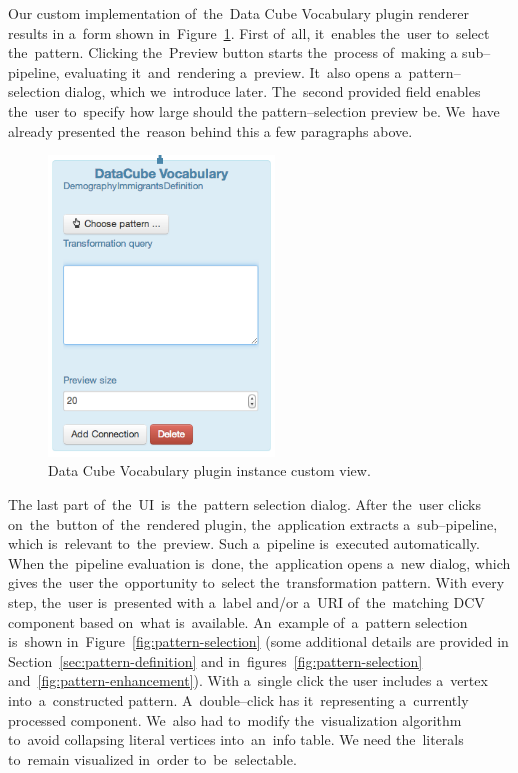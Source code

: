 Our custom implementation of~the~Data Cube Vocabulary plugin renderer results 
in a~form shown in~Figure~\ref{fig:DCV-plugin-view}. First of~all, it~enables the~user to~select the~pattern. Clicking the~Preview button starts the~process of~making a
sub--pipeline, evaluating it~and~rendering a~preview. It~also opens a~pattern--selection
dialog, which we~introduce later. The~second provided field enables the~user to~specify how large should 
the pattern--selection preview be. We~have already presented the~reason behind this 
a few paragraphs above.

\begin{figure}
	\centering
	\includegraphics[width=60mm]{img/custom-dcv-piv.png}
	\caption{Data Cube Vocabulary plugin instance custom view.}
	\label{fig:DCV-plugin-view}
\end{figure}

The last part of~the~UI~is~the~pattern selection dialog. After the~user clicks 
on~the~button of~the~rendered plugin, the~application extracts a~sub--pipeline, 
which is~relevant to~the~preview. Such a~pipeline is~executed
automatically. When the~pipeline evaluation is~done, the~application opens a~new 
dialog, which gives the~user the~opportunity to~select the~transformation 
pattern. With every step, the~user is~presented with a~label and/or a~URI of~the~matching DCV component based on~what is~available. An~example of~a~pattern 
selection is~shown in~Figure~\ref{fig:pattern-selection} (some additional details are provided
in Section~\ref{sec:pattern-definition}
and in~figures~\ref{fig:pattern-selection} and~\ref{fig:pattern-enhancement}).
With a~single click 
the user includes a~vertex into~a~constructed pattern. A~double--click 
has it~representing a~currently processed component. We~also had to~modify the~visualization algorithm to~avoid collapsing literal vertices into~an~info table. 
We need the~literals to~remain visualized in~order to~be~selectable.

